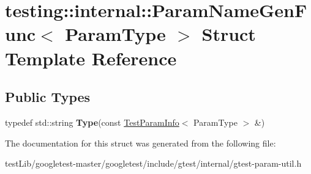 \hypertarget{structtesting_1_1internal_1_1ParamNameGenFunc}{}\section{testing\+:\+:internal\+:\+:Param\+Name\+Gen\+Func$<$ Param\+Type $>$ Struct Template Reference}
\label{structtesting_1_1internal_1_1ParamNameGenFunc}
\subsection*{Public Types}
\begin{DoxyCompactItemize}
\item 
\mbox{\label{structtesting_1_1internal_1_1ParamNameGenFunc_adf1ce5df22a930ae715082862d72590f}} 
typedef std\+::string {\bfseries Type}(const \hyperlink{structtesting_1_1TestParamInfo}{Test\+Param\+Info}$<$ Param\+Type $>$ \&)
\end{DoxyCompactItemize}


The documentation for this struct was generated from the following file\+:\begin{DoxyCompactItemize}
\item 
test\+Lib/googletest-\/master/googletest/include/gtest/internal/gtest-\/param-\/util.\+h\end{DoxyCompactItemize}
